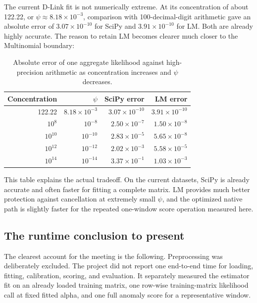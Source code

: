 \documentclass[11pt]{article}
\begin{document}
The current D-Link fit is not numerically extreme. At its concentration of
about 122.22, or \(\psi\approx8.18\times10^{-3}\), comparison with
100-decimal-digit arithmetic gave an absolute error of
\(3.07\times10^{-10}\) for SciPy and \(3.91\times10^{-10}\) for LM. Both are
already highly accurate. The reason to retain LM becomes clearer much closer
to the Multinomial boundary:

\begin{table}[htbp]
\centering
\caption{Absolute error of one aggregate likelihood against high-precision
arithmetic as concentration increases and \(\psi\) decreases.}
\label{tab:low-psi-accuracy}
\begin{tabular}{rrrr}
\toprule
Concentration & \(\psi\) & SciPy error & LM error \\
\midrule
122.22 & \(8.18\times10^{-3}\) & \(3.07\times10^{-10}\) & \(3.91\times10^{-10}\) \\
\(10^8\) & \(10^{-8}\) & \(2.50\times10^{-7}\) & \(1.50\times10^{-8}\) \\
\(10^{10}\) & \(10^{-10}\) & \(2.83\times10^{-5}\) & \(5.65\times10^{-8}\) \\
\(10^{12}\) & \(10^{-12}\) & \(2.02\times10^{-3}\) & \(5.58\times10^{-5}\) \\
\(10^{14}\) & \(10^{-14}\) & \(3.37\times10^{-1}\) & \(1.03\times10^{-3}\) \\
\bottomrule
\end{tabular}
\end{table}

This table explains the actual tradeoff. On the current datasets, SciPy is
already accurate and often faster for fitting a complete matrix. LM provides
much better protection against cancellation at extremely small \(\psi\), and
the optimized native path is slightly faster for the repeated one-window score
operation measured here.

\subsection{The runtime conclusion to present}

The clearest account for the meeting is the following. Preprocessing was
deliberately excluded. The project did not report one end-to-end time for
loading, fitting, calibration, scoring, and evaluation. It separately measured
the estimator fit on an already loaded training matrix, one row-wise
training-matrix likelihood call at fixed fitted alpha, and one full anomaly
score for a representative window.
\end{document}
